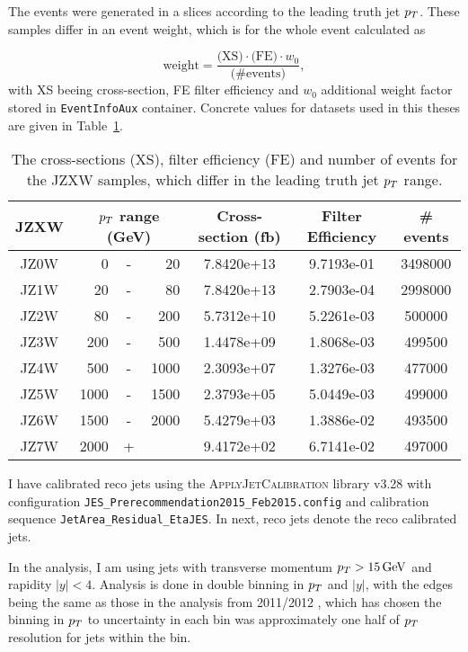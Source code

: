 The events were generated in a slices according to the leading truth jet $p_{T}$. These
samples differ in an event weight, which is for the whole event calculated as 

\begin{equation}
  \text{weight} = \frac{\text{(XS)} \cdot \text{(FE)} \cdot w_0}{\text{(\# events)}},
\end{equation}
with XS beeing cross-section, FE filter efficiency and $w_0$ additional weight
factor stored in \texttt{EventInfoAux} container. Concrete values for datasets used in
this theses are given in Table~\ref{tab:JZXW}.  

\begin{table}
  \centering
  \begin{tabular}{|c|rcr|c|c|c|}
    \hline 
     JZXW & \multicolumn{3}{|c|}{$p_{T}$ range (GeV)} & Cross-section (fb) & Filter Efficiency & \# events  \\ 
    \hline
    \hline
		 JZ0W &     0 & - &    20 & 7.8420e+13 & 9.7193e-01 & 3498000 \\ 
    \hline
		 JZ1W &    20 & - &    80 & 7.8420e+13 & 2.7903e-04 & 2998000 \\
    \hline
		 JZ2W &    80 & - &   200 & 5.7312e+10 & 5.2261e-03 & 500000  \\
    \hline
		 JZ3W &   200 & - &   500 & 1.4478e+09 & 1.8068e-03 & 499500  \\
    \hline
		 JZ4W &   500 & - &  1000 & 2.3093e+07 & 1.3276e-03 & 477000  \\
    \hline
		 JZ5W &  1000 & - &  1500 & 2.3793e+05 & 5.0449e-03 & 499000  \\
    \hline
		 JZ6W &  1500 & - &  2000 & 5.4279e+03 & 1.3886e-02 & 493500  \\
    \hline
		 JZ7W &  2000 & + &       & 9.4172e+02 & 6.7141e-02 & 497000  \\
    \hline 
  \end{tabular}
  \caption{The cross-sections (XS), filter efficiency (FE) and number of events
  for the JZXW samples, which differ in the leading truth jet $p_{T}$ range.}
  \label{tab:JZXW}
\end{table}

I have calibrated reco jets using the \textsc{ApplyJetCalibration}
\cite{ApplyJetCalibration} library v3.28 with configuration 
\texttt{JES\_Prerecommendation2015\_Feb2015.config} and
calibration sequence \texttt{JetArea\_Residual\_EtaJES}. In next, reco jets
denote the reco calibrated jets.

In the analysis, I am using jets with transverse momentum $p_{T}>15\,\text{GeV}$ and
rapidity $|y|<4$. Analysis is done in double binning in $p_{T}$ and $|y|$, with
the edges being the same as those in the analysis from 2011/2012 \cite{Analysis2012},
which has chosen the binning in $p_{T}$ to uncertainty in each bin was
approximately one half of $p_{T}$ resolution for jets within the bin.

